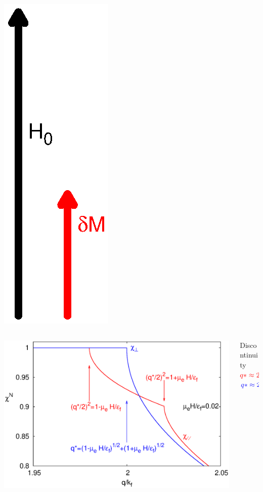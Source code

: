 \documentclass{beamer}
\begin{document}
\begin{frame}
\begin{columns}
       \begin{column}{0.1\textwidth}\centering
        \includegraphics[scale=0.25]{parallel.eps}  
      \end{column}
      
  \end{columns}
  
\begin{columns}
    \begin{column}{0.7\textwidth}
      \centering
      \includegraphics[height=0.42\textwidth, width=\textwidth]{ChiNormal.eps} \\
    \end{column}
    \begin{column}{0.32\textwidth}
    Discontinuity
    \\ \vspace{0.2cm}
  $ \textcolor{red} {q*\approx2\pm0.02}$ \\
    $\textcolor{blue}{ q*\approx2-10^{-4}} $\\
      \end{column}
  \end{columns}
\end{frame}
\end{document}
